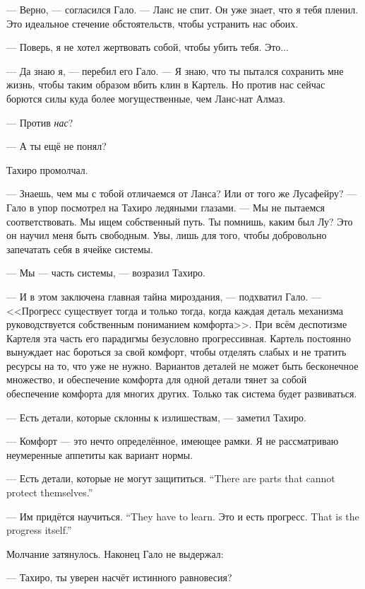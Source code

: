--- Верно, --- согласился Гало.
--- Ланс не спит.
Он уже знает, что я тебя пленил.
Это идеальное стечение обстоятельств, чтобы устранить нас обоих.

--- Поверь, я не хотел жертвовать собой, чтобы убить тебя.
Это...

--- Да знаю я, --- перебил его Гало.
--- Я знаю, что ты пытался сохранить мне жизнь, чтобы таким образом вбить клин в Картель.
Но против нас сейчас борются силы куда более могущественные, чем Ланс-нат Алмаз.

--- Против \emph{нас}?

--- А ты ещё не понял?

Тахиро промолчал.

--- Знаешь, чем мы с тобой отличаемся от Ланса?
Или от того же Лусафейру? --- Гало в упор посмотрел на Тахиро ледяными глазами.
--- Мы не пытаемся соответствовать.
Мы ищем собственный путь.
Ты помнишь, каким был Лу?
Это он научил меня быть свободным.
Увы, лишь для того, чтобы добровольно запечатать себя в ячейке системы.

--- Мы --- часть системы, --- возразил Тахиро.

--- И в этом заключена главная тайна мироздания, --- подхватил Гало.
--- <<Прогресс существует тогда и только тогда, когда каждая деталь механизма руководствуется собственным пониманием комфорта>>.
При всём деспотизме Картеля эта часть его парадигмы безусловно прогрессивная.
Картель постоянно вынуждает нас бороться за свой комфорт, чтобы отделять слабых и не тратить ресурсы на то, что уже не нужно.
Вариантов деталей не может быть бесконечное множество, и обеспечение комфорта для одной детали тянет за собой обеспечение комфорта для многих других.
Только так система будет развиваться.

--- Есть детали, которые склонны к излишествам, --- заметил Тахиро.

--- Комфорт --- это нечто определённое, имеющее рамки.
Я не рассматриваю неумеренные аппетиты как вариант нормы.

{--- Есть детали, которые не могут защититься.}
{``There are parts that cannot protect themselves.''}

{--- Им придётся научиться.}
{``They have to learn.}
{Это и есть прогресс.}
{That is the progress itself.''}

\textspace

Молчание затянулось.
Наконец Гало не выдержал:

--- Тахиро, ты уверен насчёт истинного равновесия?

